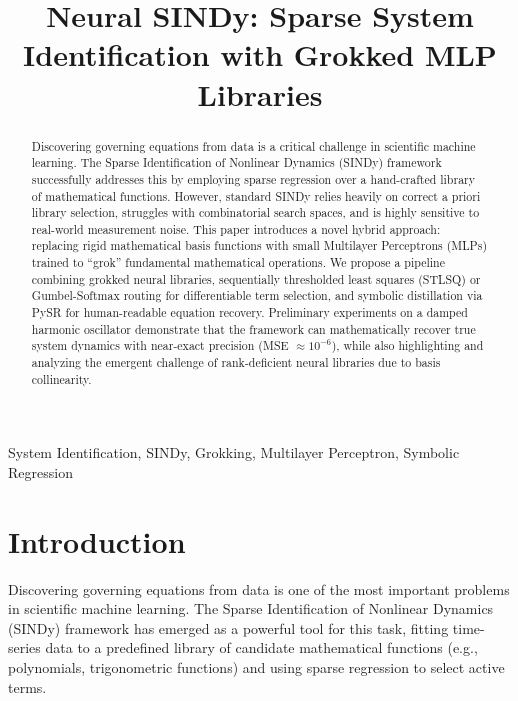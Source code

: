\documentclass[conference]{IEEEtran}
\begin{document}
\title{Neural SINDy: Sparse System Identification with Grokked MLP Libraries}

\author{
}

\maketitle

\begin{abstract}
  Discovering governing equations from data is a critical challenge in scientific machine learning. The Sparse Identification of Nonlinear Dynamics (SINDy) framework successfully addresses this by employing sparse regression over a hand-crafted library of mathematical functions. However, standard SINDy relies heavily on correct a priori library selection, struggles with combinatorial search spaces, and is highly sensitive to real-world measurement noise. This paper introduces a novel hybrid approach: replacing rigid mathematical basis functions with small Multilayer Perceptrons (MLPs) trained to ``grok'' fundamental mathematical operations. We propose a pipeline combining grokked neural libraries, sequentially thresholded least squares (STLSQ) or Gumbel-Softmax routing for differentiable term selection, and symbolic distillation via PySR for human-readable equation recovery. Preliminary experiments on a damped harmonic oscillator demonstrate that the framework can mathematically recover true system dynamics with near-exact precision (MSE $\approx 10^{-6}$), while also highlighting and analyzing the emergent challenge of rank-deficient neural libraries due to basis collinearity.
\end{abstract}

\begin{IEEEkeywords}
  System Identification, SINDy, Grokking, Multilayer Perceptron, Symbolic Regression
\end{IEEEkeywords}

\section{Introduction}
Discovering governing equations from data is one of the most important problems in scientific machine learning. The Sparse Identification of Nonlinear Dynamics (SINDy) framework \cite{b1} has emerged as a powerful tool for this task, fitting time-series data to a predefined library of candidate mathematical functions (e.g., polynomials, trigonometric functions) and using sparse regression to select active terms.
\end{document}
